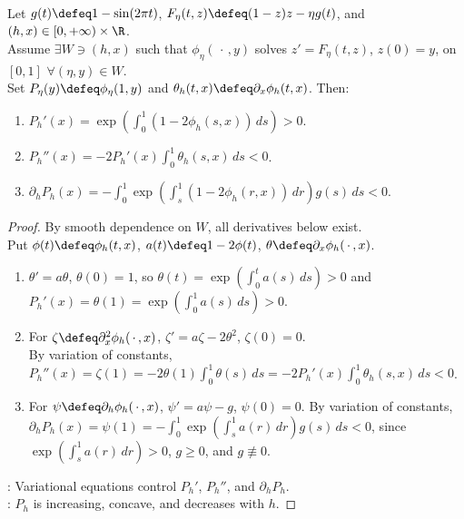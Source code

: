 \begin{proposition} \label{prop:periodic-logistic-poincare-geometry} \\
Let $g(t)\defeq1-\sin(2\pi t)$, $F_\eta(t,z)\defeq(1-z)z-\eta g(t)$, and $(h,x)\in[0,+\infty)\times\R$.\\
Assume $\exists W\ni(h,x)$ such that $\phi_\eta(\,\cdot\,,y)$ solves $z'=F_\eta(t,z)$, $z(0)=y$, on $[0,1]$ $\forall (\eta,y)\in W$.\\
Set $P_\eta(y)\defeq\phi_\eta(1,y)$ and $\theta_h(t,x)\defeq\partial_x\phi_h(t,x)$. Then:
\begin{enumerate}[label=(\roman*)]
\setlength{\itemsep}{0pt}
\item $P_h'(x)=\exp\!\left(\int_0^1(1-2\phi_h(s,x))\,ds\right)>0$.
\item $P_h''(x)=-2P_h'(x)\int_0^1\theta_h(s,x)\,ds<0$.
\item $\partial_hP_h(x)=-\int_0^1\exp\!\left(\int_s^1(1-2\phi_h(r,x))\,dr\right)g(s)\,ds<0$.
\end{enumerate}
\begin{proof}
By smooth dependence on $W$, all derivatives below exist.\\
Put $\phi(t)\defeq\phi_h(t,x)$, $a(t)\defeq1-2\phi(t)$, $\theta\defeq\partial_x\phi_h(\,\cdot\,,x)$.
\begin{enumerate}[label=(\roman*)]
\setlength{\itemsep}{0pt}
\item $\theta'=a\theta$, $\theta(0)=1$, so $\theta(t)=\exp\!\left(\int_0^t a(s)\,ds\right)>0$ and $P_h'(x)=\theta(1)=\exp\!\left(\int_0^1 a(s)\,ds\right)>0$.
\item For $\zeta\defeq\partial_x^2\phi_h(\,\cdot\,,x)$, $\zeta'=a\zeta-2\theta^2$, $\zeta(0)=0$.\\
By variation of constants, $P_h''(x)=\zeta(1)=-2\theta(1)\int_0^1\theta(s)\,ds=-2P_h'(x)\int_0^1\theta_h(s,x)\,ds<0$.
\item For $\psi\defeq\partial_h\phi_h(\,\cdot\,,x)$, $\psi'=a\psi-g$, $\psi(0)=0$. By variation of constants,\\
$\partial_hP_h(x)=\psi(1)=-\int_0^1\exp\!\left(\int_s^1 a(r)\,dr\right)g(s)\,ds<0$, since $\exp\!\left(\int_s^1 a(r)\,dr\right)>0$, $g\geq0$, and $g\not\equiv0$.
\end{enumerate}
: Variational equations control $P_h'$, $P_h''$, and $\partial_hP_h$.\\
: $P_h$ is increasing, concave, and decreases with $h$.
\end{proof}
\end{proposition}

